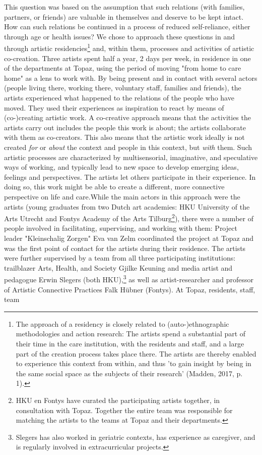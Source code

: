 \documentclass[authordate, empirical]{jote-new-article}
\begin{document}
	{
	

	This question was based on the assumption that such relations (with families, partners, or friends) are valuable in themselves and deserve to be kept intact. How can such relations be continued in a process of reduced self-reliance, either through age or health issues? We chose to approach these questions in and through artistic residencies\footnote{The approach of a residency is closely related to \linebreak (auto-)ethnographic methodologies and action research: The artists spend a substantial part of their time in the care institution, with the residents and staff, and a large part of the creation process takes place there. The artists are thereby enabled to experience this context from within, and thus 'to gain insight by being in the same social space as the subjects of their research' (Madden, 2017, p. 1).} and, within them, processes and activities of artistic co-creation. Three artists spent half a year, 2 days per week, in residence in one of the departments at Topaz, using the period of moving "from home to care home" as a lens to work with. By being present and in contact with several actors (people living there, working there, voluntary staff, families and friends), the artists experienced what happened to the relations of the people who have moved. They used their experiences as inspiration to react by means of (co-)creating artistic work. A co-creative approach means that the activities the artists carry out includes the people this work is about; the artists collaborate with them as co-creators. This also means that the artistic work ideally is not created \emph{for} or \emph{about }the context and people in this context, but \emph{with} them. Such artistic processes are characterized by multisensorial, imaginative, and speculative ways of working, and typically lead to new space to develop emerging ideas, feelings and perspectives. The artists let others participate in their experience. In doing so, this work might be able to create a different, more connective perspective on life and care.While the main actors in this approach were the artists (young graduates from two Dutch art academies: HKU University of the Arts Utrecht and Fontys Academy of the Arts Tilburg\footnote{ HKU en Fontys have curated the participating artists together, in consultation with Topaz. Together the entire team was responsible for matching the artists to the teams at Topaz and their departments.}), there were a number of people involved in facilitating, supervising, and working with them: Project leader "Kleinschalig Zorgen" Eva van Zelm coordinated the project at Topaz and was the first point of contact for the artists during their residence. The artists were further supervised by a team from all three participating institutions: trailblazer Arts, Health, and Society Gjilke Keuning and media artist and pedagogue Erwin Slegers (both HKU),\footnote{ Slegers has also worked in geriatric contexts, has experience as caregiver, and is regularly involved in extracurricular projects. } as well as artist-researcher and professor of Artistic Connective Practices Falk Hübner (Fontys). At Topaz, residents, staff, team }
\end{document}
